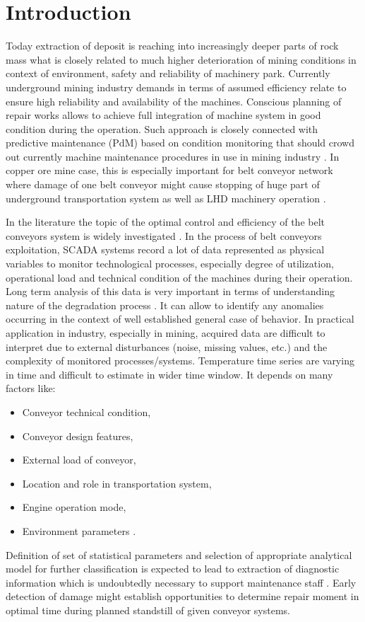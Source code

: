 \section{Introduction} 
Today extraction of deposit is reaching into increasingly deeper parts of rock mass what is closely related to much higher deterioration of mining conditions in context of environment, safety and reliability of machinery park. Currently underground mining industry demands in terms of assumed efficiency relate to ensure high reliability and availability of the machines. Conscious planning of repair works allows to achieve full integration of machine system in good condition during the operation. Such approach is closely connected with predictive maintenance (PdM) based on condition monitoring that should crowd out currently machine maintenance procedures in use in mining industry \cite{Blazej2016,Jonak2006,Stefaniak2012}.
In copper ore mine case, this is especially important for belt conveyor network where damage of one belt conveyor might cause stopping of huge part of underground transportation system as well as LHD machinery operation \cite{Stefaniak2012}. \par
In the literature the topic of the optimal control and efficiency of the belt conveyors system is widely investigated \cite{Bartelmus2014,Krol2016,Zhang2010}. In the process of belt conveyors exploitation, SCADA systems record a lot of data represented as physical variables to monitor technological processes, especially degree of utilization, operational load and technical condition of the machines during their operation. Long term analysis of this data is very important in terms of understanding nature of the degradation process \cite{Astolfi2014,Bongers2008,c5}. It can allow to identify any anomalies occurring in the context of well established general case of behavior. In  practical  application  in  industry, especially in mining, acquired data are difficult to interpret due to external disturbances (noise, missing values, etc.) and  the complexity  of  monitored  processes/systems. Temperature time series are varying in time and difficult to estimate in wider time window. It depends on many factors like: 
\begin{itemize}
\renewcommand{\labelitemi}{$\bullet$}
\item Conveyor technical condition,
\item Conveyor design features,
\item External load of conveyor,
\item Location and role in transportation system,
\item Engine operation mode,
\item Environment parameters \cite{Obuchowski,Sawicki}.
\end{itemize}
Definition of set of statistical parameters and selection of appropriate analytical model for further classification is expected to lead to extraction of diagnostic information which is undoubtedly necessary to support maintenance staff \cite{Kaufman,Stefaniak2015}. Early detection of damage might establish opportunities to determine repair moment in optimal time during planned standstill of given conveyor systems.

